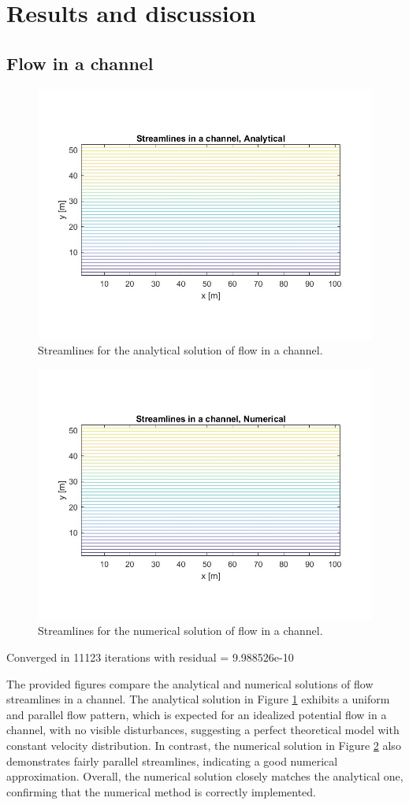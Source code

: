 \section{Results and discussion}

\subsection{Flow in a channel}

\begin{figure}[H]
    \centering
    \includegraphics[width=0.7\linewidth]{imatges/strmchannelanal.jpg}
    \caption{Streamlines for the analytical solution of flow in a channel.}
    \label{fig:nocilinderanalytical}
\end{figure}

\begin{figure}[H]
    \centering
    \includegraphics[width=0.7\linewidth]{imatges/strmchannelnum.jpg}
    \caption{Streamlines for the numerical solution of flow in a channel.}
    \label{fig:nocilindernumerical}
\end{figure}

Converged in 11123 iterations with residual = 9.988526e-10

The provided figures compare the analytical and numerical solutions of flow streamlines in a channel. The analytical solution in Figure \ref{fig:nocilinderanalytical} exhibits a uniform and parallel flow pattern, which is expected for an idealized potential flow in a channel, with no visible disturbances, suggesting a perfect theoretical model with constant velocity distribution. In contrast, the numerical solution in Figure \ref{fig:nocilindernumerical} also demonstrates fairly parallel streamlines, indicating a good numerical approximation. Overall, the numerical solution closely matches the analytical one, confirming that the numerical method is correctly implemented.
